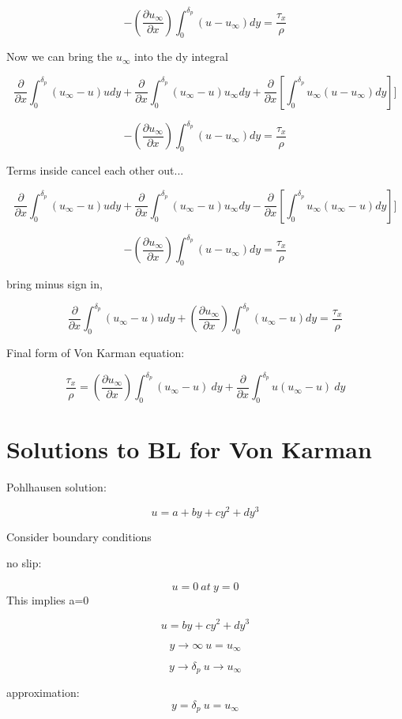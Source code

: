\documentclass[11pt]{article}
\begin{document}
$$-( \frac{\partial u_\infty}{\partial x}) \int_0^{\delta_p} (u - u_\infty )dy = \frac{\tau_x}{\rho}  $$

Now we can bring the $u_\infty$ into the dy integral

$$  \frac{\partial}{\partial x}   \int_0^{\delta_p} ( u_\infty - u) u dy  + \frac{\partial}{\partial x}   \int_0^{\delta_p} ( u_\infty - u) u_\infty dy  +\frac{\partial }{\partial x}[\int_0^{\delta_p} u_\infty (u -  u_\infty )dy]] $$

$$-( \frac{\partial u_\infty}{\partial x}) \int_0^{\delta_p} (u - u_\infty )dy = \frac{\tau_x}{\rho}  $$


Terms inside cancel each other out...

$$  \frac{\partial}{\partial x}   \int_0^{\delta_p} ( u_\infty - u) u dy  + \frac{\partial}{\partial x}   \int_0^{\delta_p} ( u_\infty - u) u_\infty dy  -\frac{\partial }{\partial x}[\int_0^{\delta_p} u_\infty ( u_\infty - u)dy]] $$

$$-( \frac{\partial u_\infty}{\partial x}) \int_0^{\delta_p} (u - u_\infty )dy = \frac{\tau_x}{\rho}  $$

bring minus sign in,


$$  \frac{\partial}{\partial x}   \int_0^{\delta_p} ( u_\infty - u) u dy +( \frac{\partial u_\infty}{\partial x}) \int_0^{\delta_p} ( u_\infty - u )dy = \frac{\tau_x}{\rho}  $$

Final form of Von Karman equation:

$$ \frac{\tau_x}{\rho} = ( \frac{\partial u_\infty}{\partial x}) \int_0^{\delta_p} ( u_\infty - u ) \ dy  + \frac{\partial}{\partial x}   \int_0^{\delta_p} u( u_\infty - u) \ dy $$

\section{Solutions to BL for Von Karman}

Pohlhausen solution:

$$u = a + b y + c y^2 + d y^3$$

Consider boundary conditions

no slip:

$$u = 0 \ at \  y=0$$
This implies a=0

$$u = b y + c y^2 + d y^3$$

$$y \rightarrow \infty \  u = u_\infty$$

$$y \rightarrow \delta_p \  u \rightarrow u_\infty$$

approximation:
$$y = \delta_p \  u =  u_\infty$$
\end{document}
